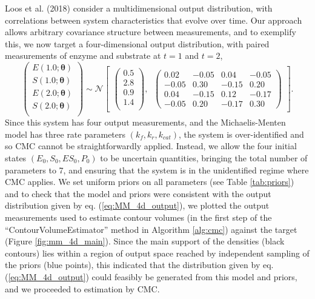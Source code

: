 \documentclass[10pt,letterpaper]{article}
\begin{document}
Loos et al. (2018) consider a multidimensional output distribution, with correlations between system characteristics that evolve over time. Our approach allows arbitrary covariance structure between measurements, and to exemplify this, we now target a four-dimensional output distribution, with paired measurements of enzyme and substrate at $t=1$ and $t=2$,
%
\begin{equation}\label{eq:MM_4d_output}
\begin{pmatrix}
E(1.0; \boldsymbol{\theta})\\
S(1.0; \boldsymbol{\theta})\\
E(2.0; \boldsymbol{\theta})\\
S(2.0; \boldsymbol{\theta})\\
\end{pmatrix} \sim  \mathcal{N}
\begin{bmatrix}
\begin{pmatrix}
0.5\\
2.8\\
0.9\\
1.4\\
\end{pmatrix}, \;\;
\begin{pmatrix}
0.02 &  -0.05 &  0.04 & -0.05\\
-0.05 & 0.30  & -0.15 & 0.20\\
0.04 & -0.15  & 0.12  &  -0.17\\
-0.05 & 0.20 & -0.17 & 0.30
\end{pmatrix}
\end{bmatrix}.
\end{equation}
%
Since this system has four output measurements, and the Michaelis-Menten model has three rate parameters $(k_f,k_r,k_{cat})$, the system is over-identified and so CMC cannot be straightforwardly applied. Instead, we allow the four initial states $(E_0, S_0, ES_0, P_0)$ to be uncertain quantities, bringing the total number of parameters to 7, and ensuring that the system is in the unidentified regime where CMC applies. We set uniform priors on all parameters (see Table \ref{tab:priors}) and to check that the model and priors were consistent with the output distribution given by eq. (\ref{eq:MM_4d_output}), we plotted the output measurements used to estimate contour volumes (in the first step of the ``ContourVolumeEstimator'' method in Algorithm \ref{alg:cmc}) against the target (Figure \ref{fig:mm_4d_main}). Since the main support of the densities (black contours) lies within a region of output space reached by independent sampling of the priors (blue points), this indicated that the distribution given by eq. (\ref{eq:MM_4d_output}) could feasibly be generated from this model and priors, and we proceeded to estimation by CMC.
\end{document}
